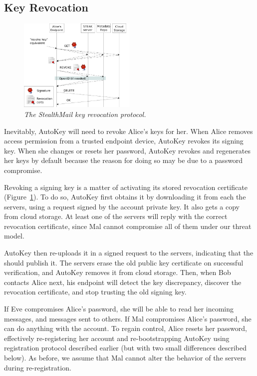 \subsection{Key Revocation}


\begin{figure}[h!]
\centering
\includegraphics[width=0.5\textwidth]{figures/revoke}
\caption{\it The StealthMail key revocation protocol.}
\label{fig:revoke}
\end{figure}

Inevitably, AutoKey will need to revoke Alice’s keys for her.  When Alice removes access permission from a trusted endpoint device, AutoKey revokes its signing key.  When she changes or resets her password, AutoKey revokes and regenerates her keys by default because the reason for doing so may be due to a password compromise.

Revoking a signing key is a matter of activating its stored revocation certificate (Figure~\ref{fig:revoke}).  To do so, AutoKey first obtains it by downloading it from each the servers, using a request signed by the account private key.  It also gets a copy from cloud storage.  At least one of the servers will reply with the correct revocation certificate, since Mal cannot compromise all of them under our threat model.

AutoKey then re-uploads it in a signed request to the servers, indicating that the should publish it.  The servers erase the old public key certificate on successful verification, and AutoKey removes it from cloud storage.  Then, when Bob contacts Alice next, his endpoint will detect the key discrepancy, discover the revocation certificate, and stop trusting the old signing key.

If Eve compromises Alice’s password, she will be able to read her incoming messages, and messages sent to others.  If Mal compromises Alice’s password, she can do anything with the account.  To regain control, Alice resets her password, effectively re-registering her account and re-bootstrapping AutoKey using registration protocol described earlier (but with two small differences described below).  As before, we assume that Mal cannot alter the behavior of the servers during re-registration.

